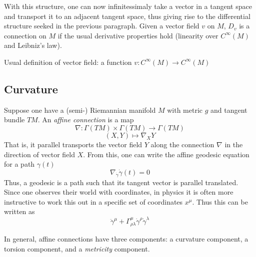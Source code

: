 With this structure, one can now infinitessimaly take a vector in a tangent space and transport it to an adjacent tangent space, thus giving rise to the differential structure seeked in the previous paragraph. Given a vector field $v$ on $M$, $D_v$ is a connection on $M$ if the usual derivative properties hold (linearity over $C^{\infty}(M)$ and Leibniz's law). 

Usual definition of vector field: a function $v:C^\infty(M) \rightarrow C^\infty(M)$

\subsection{Curvature}
Suppose one have a (semi-) Riemannian manifold $M$ with metric $g$ and tangent bundle $TM$. An \textit{affine connection} is a map
\begin{equation}
	\nabla : \Gamma (TM) \times \Gamma (TM) \rightarrow \Gamma (TM)
\end{equation}
\begin{equation}
	(X,Y) \mapsto \nabla_X Y
\end{equation}
That is, it parallel transports the vector field $Y$ along the connection $\nabla$ in the direction of vector field $X$. From this, one can write the affine geodesic equation for a path $\gamma(t)$
\begin{equation}
	\nabla_{\dot\gamma} \dot\gamma(t) = 0
\end{equation}
Thus, a geodesic is a path such that its tangent vector is parallel translated. Since one observes their world with coordinates, in physics it is often more instructive to work this out in a specific set of coordinates $x^\mu$. Thus this can be written as
\begin{equation}
	\ddot{\gamma}^\mu + \Gamma^{\mu}_{\rho\lambda}\dot{\gamma}^\rho \dot{\gamma}^\lambda 
\end{equation}

In general, affine connections have three components: a curvature component, a torsion component, and a \textit{metricity} component. 

